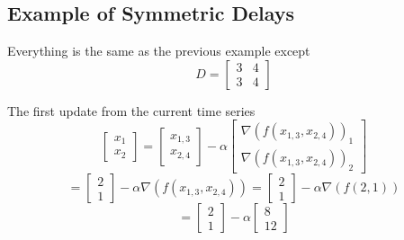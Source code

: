 \documentclass[10pt]{elsarticle}
\theoremstyle{remark}
\begin{document}
\subsection*{Example of Symmetric Delays}
Everything is the same as the previous example except 
\begin{equation}
D = \begin{bmatrix}
3&4 \\
3&4 
\end{bmatrix}
\end{equation}

The first update from the current time series
\[
\begin{bmatrix}
    x_{1}\\
    x_{2}
\end{bmatrix} = 
\begin{bmatrix}
    x_{1,3}\\
    x_{2,4}   
\end{bmatrix} - \alpha
\begin{bmatrix}
    \nabla(f(x_{1,3},x_{2,4}))_{1} \\
    \nabla(f(x_{1,3},x_{2,4}))_{2}
\end{bmatrix}
\]
\[
 = 
\begin{bmatrix}
   2 \\
   1
\end{bmatrix} - \alpha
\nabla(f(x_{1,3},x_{2,4})) = 
\begin{bmatrix}
    2 \\
    1
\end{bmatrix} - \alpha
\nabla(f(2,1))
\]
\[
 = 
\begin{bmatrix}
    2 \\
    1
\end{bmatrix} - \alpha
\begin{bmatrix}
    8 \\
    12 
\end{bmatrix}
\]
\end{document}
